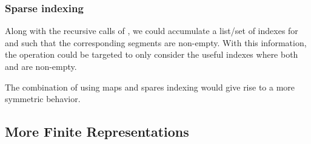 \subsubsection{Sparse indexing}
Along with the recursive calls of , we could accumulate
a list/set of indexes for  and  such that the
corresponding segments are non-empty. With this information, the
 operation could be targeted to only consider the useful
indexes where both  and  are
non-empty.

The combination of using maps and spares indexing would give rise to a
more symmetric behavior.




\subsection{More Finite Representations}
\label{sec:more-finite-repr}



\clearpage{}
